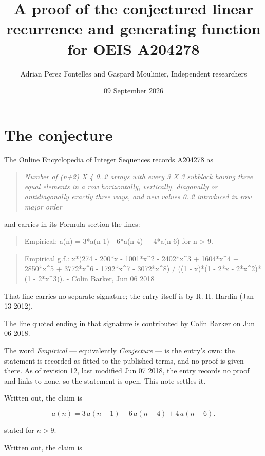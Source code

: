 \documentclass[11pt]{article}
\title{A proof of the conjectured linear recurrence and generating function for OEIS A204278}
\author{Adrian Perez Fontelles and Gaspard Moulinier, Independent researchers}
\date{09 September 2026}
\theoremstyle{definition}
\begin{document}
\maketitle
\section{The conjecture}

The Online Encyclopedia of Integer Sequences records \href{https://oeis.org/A204278}{A204278} as

\begin{quote}\itshape Number of (n+2) X 4 0..2 arrays with every 3 X 3 subblock having three equal elements in a row horizontally, vertically, diagonally or antidiagonally exactly three ways, and new values 0..2 introduced in row major order\end{quote}

and carries in its Formula section the lines:

\begin{quote}\ttfamily Empirical: a(n) = 3*a(n-1) - 6*a(n-4) + 4*a(n-6) for n > 9.\end{quote}

\begin{quote}\ttfamily Empirical g.f.: x*(274 - 200*x - 1001*x\textasciicircum{}2 - 2402*x\textasciicircum{}3 + 1604*x\textasciicircum{}4 + 2850*x\textasciicircum{}5 + 3772*x\textasciicircum{}6 - 1792*x\textasciicircum{}7 - 3072*x\textasciicircum{}8) / ((1 - x)*(1 - 2*x - 2*x\textasciicircum{}2)*(1 - 2*x\textasciicircum{}3)). - Colin Barker, Jun 06 2018\end{quote}

That line carries no separate signature; the entry itself is by R. H. Hardin (Jan 13 2012).

The line quoted ending in that signature is contributed by Colin Barker on Jun 06 2018.

The word {\itshape Empirical} --- equivalently {\itshape Conjecture} --- is the entry's own: the statement is recorded as fitted to the published terms, and no proof is given there. As of revision 12, last modified Jun 07 2018, the entry records no proof and links to none, so the statement is open. This note settles it.

Written out, the claim is

\[a(n) = 3\,a(n-1) - 6\,a(n-4) + 4\,a(n-6).\]

stated for $n > 9$.

Written out, the claim is
\end{document}

